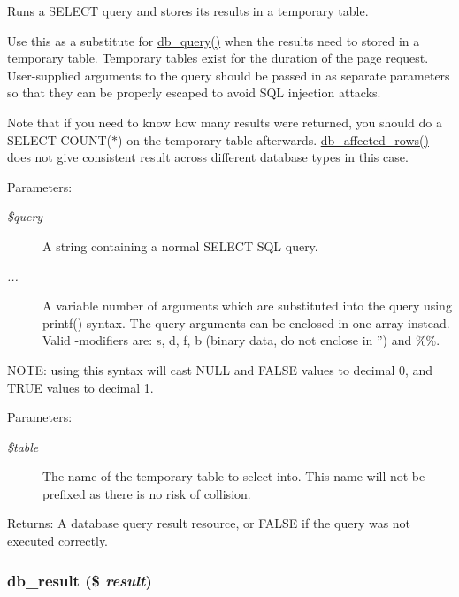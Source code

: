 Runs a SELECT query and stores its results in a temporary table.

Use this as a substitute for \hyperlink{database_8mysql-common_8inc_9e096321b86945d128746ac7bedce8f3}{db\_\-query()} when the results need to stored in a temporary table. Temporary tables exist for the duration of the page request. User-supplied arguments to the query should be passed in as separate parameters so that they can be properly escaped to avoid SQL injection attacks.

Note that if you need to know how many results were returned, you should do a SELECT COUNT($\ast$) on the temporary table afterwards. \hyperlink{database_8mysql_8inc_e3bc677fbeebd688068ce3b413ac2944}{db\_\-affected\_\-rows()} does not give consistent result across different database types in this case.

\begin{Desc}
\item[Parameters:]
\begin{description}
\item[{\em \$query}]A string containing a normal SELECT SQL query. \item[{\em ...}]A variable number of arguments which are substituted into the query using printf() syntax. The query arguments can be enclosed in one array instead. Valid -modifiers are: s, d, f, b (binary data, do not enclose in '') and \%\%.\end{description}
\end{Desc}
NOTE: using this syntax will cast NULL and FALSE values to decimal 0, and TRUE values to decimal 1.

\begin{Desc}
\item[Parameters:]
\begin{description}
\item[{\em \$table}]The name of the temporary table to select into. This name will not be prefixed as there is no risk of collision. \end{description}
\end{Desc}
\begin{Desc}
\item[Returns:]A database query result resource, or FALSE if the query was not executed correctly. \end{Desc}
\hypertarget{database_8mysqli_8inc_953354ea01b236440b187210dc18aad9}{
\subsubsection[{db\_\-result}]{\setlength{\rightskip}{0pt plus 5cm}db\_\-result (\$ {\em result})}}
\label{database_8mysqli_8inc_953354ea01b236440b187210dc18aad9}


